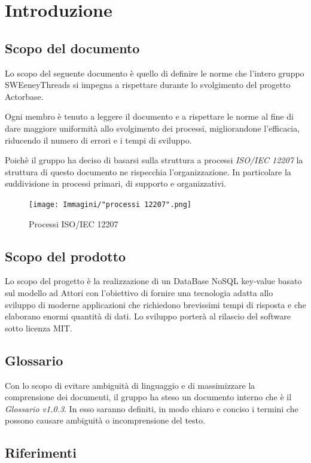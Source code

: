 \documentclass[a4paper]{report}
\newcommand{\mychapter}[2]{
	\setcounter{chapter}{#1}
	\setcounter{section}{0}
	\setcounter{subsection}{1}
	\chapter*{#2}
	\addcontentsline{toc}{chapter}{#2}
}
\begin{document}
	\mychapter{1}{Introduzione}
	\section{Scopo del documento}
		Lo scopo del seguente documento è quello di definire le norme che l'intero gruppo SWEeneyThreads si 
		impegna a rispettare durante lo svolgimento 
		del progetto Actorbase. 
		
		Ogni membro è tenuto a leggere il documento e a rispettare le norme al fine di dare maggiore uniformità 
		allo svolgimento dei processi, 
		migliorandone l'efficacia, riducendo il numero di errori e i tempi di sviluppo.
		
		Poichè il gruppo ha deciso di basarsi sulla struttura a processi \emph{ISO/IEC 12207} 
		la struttura di questo documento ne rispecchia 
		l'organizzazione. In particolare la suddivisione in processi primari, di supporto e organizzativi.
		\begin{figure}[H]
			\centering
			\texttt{[image: Immagini/"processi 12207".png]}
			\caption{Processi ISO/IEC 12207}
		\end{figure}
	\section{Scopo del prodotto}
		Lo scopo del progetto è la realizzazione di un DataBase NoSQL key-value basato sul modello ad 
		Attori con l'obiettivo di fornire una tecnologia adatta allo sviluppo di moderne 
		applicazioni che richiedono brevissimi tempi di risposta e che elaborano enormi quantità 
		di dati. Lo sviluppo porterà al rilascio del software sotto licenza MIT.
	\section{Glossario}
		Con lo scopo di evitare ambiguità di linguaggio e di massimizzare la comprensione dei documenti, il 
      gruppo ha steso un documento interno che è il \emph{Glossario v1.0.3}. In esso saranno definiti, in modo
      chiaro e conciso i termini che possono causare ambiguità o incomprensione del testo.
	\section{Riferimenti}
\end{document}
